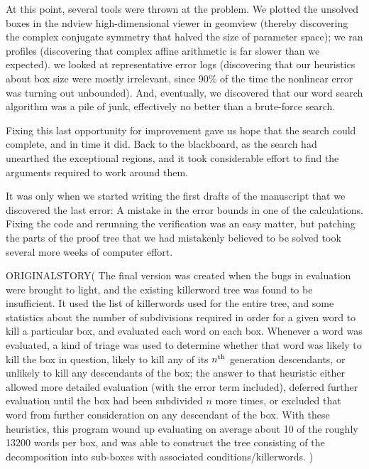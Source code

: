 At this point, several tools were thrown at the problem. We plotted the unsolved boxes in the ndview high-dimensional viewer in geomview (thereby discovering the complex conjugate symmetry that halved the size of parameter space); we ran profiles (discovering that complex affine arithmetic is far slower than we expected). we looked at representative error logs (discovering that our heuristics about box size were mostly irrelevant, since 90\% of the time the nonlinear error was turning out unbounded). And, eventually, we discovered that our word search algorithm was a pile of junk, effectively no better than a brute-force search.

Fixing this last opportunity for improvement gave us hope that the search could complete, and in time it did.  Back to the blackboard, as the search had unearthed the exceptional regions, and it took considerable effort to find the arguments required to work around them.

It was only when we started writing the first drafts of the manuscript that we discovered the last error: A mistake in the error bounds in one of the calculations. Fixing the code and rerunning the verification was an easy matter, but patching the parts of the proof tree that we had mistakenly believed to be solved took several more weeks of computer effort.

ORIGINALSTORY(
The final version was created when the bugs in evaluation were 
brought to light, and the existing killerword tree was found to be insufficient.  
It used the list of killerwords used for the entire tree, and some 
statistics about the number of subdivisions required in order for a 
given word to kill a particular box, and evaluated each word on each box.  Whenever 
a word was evaluated, a kind of triage was used to determine 
whether that word was likely to kill the box in question, likely to kill 
any of its $n^{\rm th}$ generation descendants, or unlikely to kill any 
descendants of the box; the answer to that heuristic either allowed more 
detailed evaluation (with the error term included), deferred further 
evaluation until the box had been subdivided $n$ more times, or 
excluded that word from further consideration on any descendant of 
the box.  With these heuristics, this program wound up evaluating on 
average about 10 of the roughly 13200 words per box, and was able to 
construct the tree consisting of the decomposition into sub-boxes with associated conditions/killerwords.
)


